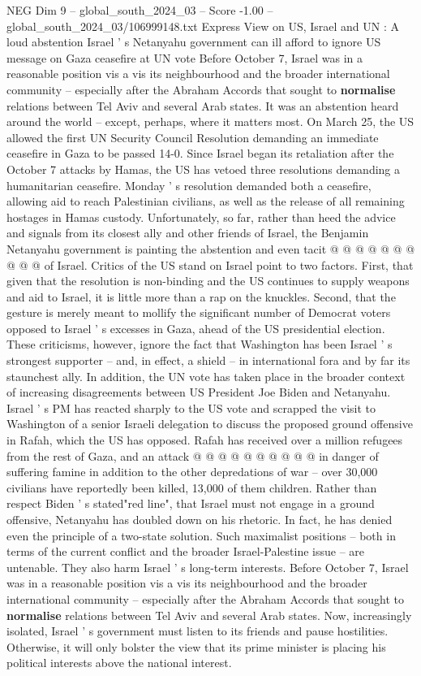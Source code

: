 \begin{textsample}{NEG Dim 9 – global\_south\_2024\_03 – Score -1.00 – global\_south\_2024\_03/106999148.txt}  \label{ex:f9_neg_407}
Express View on US, Israel and UN : A loud abstention Israel ' s Netanyahu government can ill afford to ignore US message on Gaza ceasefire at UN vote Before October 7, Israel was in a reasonable position vis a vis its neighbourhood and the broader international community -- especially after the Abraham Accords that sought to \textbf{normalise} relations between Tel Aviv and several Arab states.
It was an abstention heard around the world -- except, perhaps, where it matters most.
On March 25, the US allowed the first UN Security Council Resolution demanding an immediate ceasefire in Gaza to be passed 14-0.
Since Israel began its retaliation after the October 7 attacks by Hamas, the US has vetoed three resolutions demanding a humanitarian ceasefire.
Monday ' s resolution demanded both a ceasefire, allowing aid to reach Palestinian civilians, as well as the release of all remaining hostages in Hamas custody.
Unfortunately, so far, rather than heed the advice and signals from its closest ally and other friends of Israel, the Benjamin Netanyahu government is painting the abstention and even tacit @ @ @ @ @ @ @ @ @ @ of Israel.
Critics of the US stand on Israel point to two factors.
First, that given that the resolution is non-binding and the US continues to supply weapons and aid to Israel, it is little more than a rap on the knuckles.
Second, that the gesture is merely meant to mollify the significant number of Democrat voters opposed to Israel ' s excesses in Gaza, ahead of the US presidential election.
These criticisms, however, ignore the fact that Washington has been Israel ' s strongest supporter -- and, in effect, a shield -- in international fora and by far its staunchest ally.
In addition, the UN vote has taken place in the broader context of increasing disagreements between US President Joe Biden and Netanyahu.
Israel ' s PM has reacted sharply to the US vote and scrapped the visit to Washington of a senior Israeli delegation to discuss the proposed ground offensive in Rafah, which the US has opposed.
Rafah has received over a million refugees from the rest of Gaza, and an attack @ @ @ @ @ @ @ @ @ @ in danger of suffering famine in addition to the other depredations of war -- over 30,000 civilians have reportedly been killed, 13,000 of them children.
Rather than respect Biden ' s stated"red line", that Israel must not engage in a ground offensive, Netanyahu has doubled down on his rhetoric.
In fact, he has denied even the principle of a two-state solution.
Such maximalist positions -- both in terms of the current conflict and the broader Israel-Palestine issue -- are untenable.
They also harm Israel ' s long-term interests.
Before October 7, Israel was in a reasonable position vis a vis its neighbourhood and the broader international community -- especially after the Abraham Accords that sought to \textbf{normalise} relations between Tel Aviv and several Arab states.
Now, increasingly isolated, Israel ' s government must listen to its friends and pause hostilities.
Otherwise, it will only bolster the view that its prime minister is placing his political interests above the national interest.

\end{textsample}
